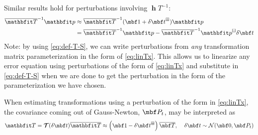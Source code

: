 \documentclass[11pt,a4,oneside]{article}
\begin{document}
Similar results hold for perturbations involving $\mbfh T^{-1}$:
\begin{subequations}
	\begin{flalign}
		\mbfhbar T^{-1} \mbfh p & \approx \mbfhbar T^{-1}(\mbf 1 + \mbfdel t^\boxplus)\mbfh p\\
   		&= \mbfhbar T^{-1}\mbfh p - \mbfhbar T^{-1}\mbfh p^\boxminus\mbfdel t
	\end{flalign}
\end{subequations}
Note: by using \eqref{eq:def-T-S}, we can write perturbations from {\em any} transformation matrix parameterization in the form of \eqref{eq:linTx}. This allows us to linearize any error equation using perturbations of the form of \eqref{eq:linTx} and substitute in \eqref{eq:def-T-S} when we are done to get the perturbation in the form of the parameterization we have chosen.

When estimating transformations using a perturbation of the form in \eqref{eq:linTx}, the covariance coming out of Gauss-Newton, $\mbf P_t$, may be interpreted as
\begin{equation}
  \label{eq:uncertainty-T}
  \mbfh T = \mbc T(\mbfdel t) \mbfhbar T \approx \left(\mbf 1 - \mbfdel t^\boxplus \right)\mbfbar T, \;\;\;\;\mbfdel t \sim \mathcal{N}(\mbf 0, \mbf P_t)
\end{equation}
\end{document}
